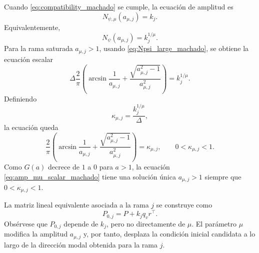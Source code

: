 \documentclass[journal]{IEEEtran}
\begin{document}
Cuando \eqref{eq:compatibility_machado} se cumple, la ecuación de amplitud es
\begin{equation}
\label{eq:amp_mu_eq_machado}
N_{\psi,\mu}(a_{\mu,j})=k_j.
\end{equation}
Equivalentemente,
\begin{equation}
\label{eq:amp_mu_root_machado}
N_\psi(a_{\mu,j})
=
k_j^{1/\mu}.
\end{equation}
Para la rama saturada \(a_{\mu,j}>1\), usando
\eqref{eq:Npsi_large_machado}, se obtiene la ecuación escalar
\begin{equation}
\label{eq:amp_mu_explicit_machado}
\Delta
\frac{2}{\pi}
\left(
\arcsin\frac1{a_{\mu,j}}+
\frac{\sqrt{a_{\mu,j}^2-1}}{a_{\mu,j}^2}
\right)
=
k_j^{1/\mu}.
\end{equation}
Definiendo
\begin{equation}
\label{eq:Kmu_def_machado}
\kappa_{\mu,j}
=
\frac{k_j^{1/\mu}}{\Delta},
\end{equation}
la ecuación queda
\begin{equation}
\label{eq:amp_mu_scalar_machado}
\frac{2}{\pi}
\left(
\arcsin\frac1{a_{\mu,j}}+
\frac{\sqrt{a_{\mu,j}^2-1}}{a_{\mu,j}^2}
\right)
=
\kappa_{\mu,j},
\qquad
0<\kappa_{\mu,j}<1.
\end{equation}
Como \(G(a)\) decrece de \(1\) a \(0\) para \(a>1\), la ecuación
\eqref{eq:amp_mu_scalar_machado} tiene una solución única
\(a_{\mu,j}>1\) siempre que \(0<\kappa_{\mu,j}<1\).

La matriz lineal equivalente asociada a la rama \(j\) se construye como
\begin{equation}
\label{eq:P0_mu_machado}
P_{0,j}
=
P+k_jq_vr^\top.
\end{equation}
Obsérvese que \(P_{0,j}\) depende de \(k_j\), pero no directamente de
\(\mu\). El parámetro \(\mu\) modifica la amplitud \(a_{\mu,j}\) y, por
tanto, desplaza la condición inicial candidata a lo largo de la dirección
modal obtenida para la rama \(j\).
\end{document}

